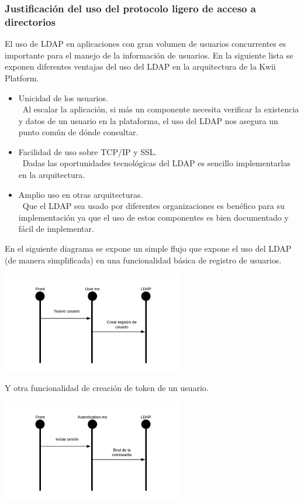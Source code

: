 \subsubsection{Justificación del uso del protocolo ligero de acceso a directorios}

El uso de LDAP en aplicaciones con gran volumen de usuarios concurrentes es importante para el manejo de la información de usuarios. En la siguiente lista se exponen diferentes ventajas del uso del LDAP en la arquitectura de la Kwii Platform.

\begin{itemize}
    \item Unicidad de los usuarios.\\\
    Al escalar la aplicación, si más un componente necesita verificar la existencia y datos de un usuario en la plataforma, el uso del LDAP nos asegura un punto común de dónde consultar.
    \item Facilidad de uso sobre TCP/IP y SSL.\\\
    Dadas las oportunidades tecnológicas del LDAP es sencillo implementarlas en la arquitectura.
    \item Amplio uso en otras arquitecturas.\\\
    Que el LDAP sea usado por diferentes organizaciones es benéfico para su implementación ya que el uso de estos componentes es bien documentado y fácil de implementar. 
\end{itemize}

En el siguiente diagrama se expone un simple flujo que expone el uso del LDAP (de manera simplificada) en una funcionalidad básica de registro de usuarios.

\begin{center}
    \includegraphics[width=8cm]{Figures/P4/LDAPFlow1.png}
\end{center}

Y otra funcionalidad de creación de token de un usuario.

\begin{center}
    \includegraphics[width=8cm]{Figures/P4/LDAPFlow2.png}
\end{center}